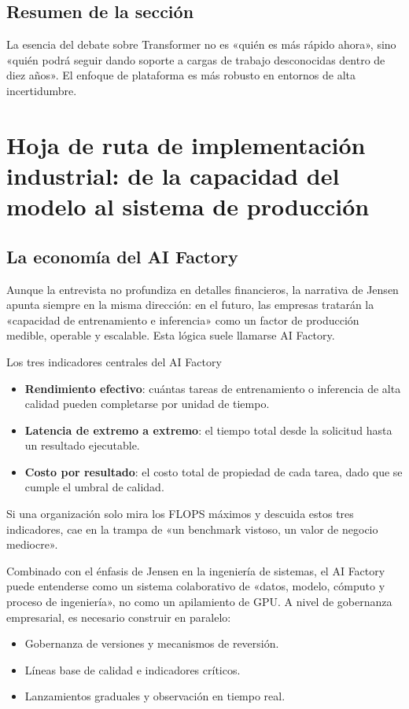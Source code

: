 \documentclass[a4paper]{article}
\begin{document}
\subsection{Resumen de la sección}
La esencia del debate sobre Transformer no es «quién es más rápido ahora», sino «quién podrá seguir dando soporte a cargas de trabajo desconocidas dentro de diez años». El enfoque de plataforma es más robusto en entornos de alta incertidumbre.

\section{Hoja de ruta de implementación industrial: de la capacidad del modelo al sistema de producción}

\subsection{La economía del AI Factory}

Aunque la entrevista no profundiza en detalles financieros, la narrativa de Jensen apunta siempre en la misma dirección: en el futuro, las empresas tratarán la «capacidad de entrenamiento e inferencia» como un factor de producción medible, operable y escalable. Esta lógica suele llamarse AI Factory.

\begin{knowledgebox}{Los tres indicadores centrales del AI Factory}
\begin{itemize}
    \item \textbf{Rendimiento efectivo}: cuántas tareas de entrenamiento o inferencia de alta calidad pueden completarse por unidad de tiempo.
    \item \textbf{Latencia de extremo a extremo}: el tiempo total desde la solicitud hasta un resultado ejecutable.
    \item \textbf{Costo por resultado}: el costo total de propiedad de cada tarea, dado que se cumple el umbral de calidad.
\end{itemize}
Si una organización solo mira los FLOPS máximos y descuida estos tres indicadores, cae en la trampa de «un benchmark vistoso, un valor de negocio mediocre».
\end{knowledgebox}

Combinado con el énfasis de Jensen en la ingeniería de sistemas, el AI Factory puede entenderse como un sistema colaborativo de «datos, modelo, cómputo y proceso de ingeniería», no como un apilamiento de GPU. A nivel de gobernanza empresarial, es necesario construir en paralelo:
\begin{itemize}
    \item Gobernanza de versiones y mecanismos de reversión.
    \item Líneas base de calidad e indicadores críticos.
    \item Lanzamientos graduales y observación en tiempo real.
\end{itemize}
\end{document}
